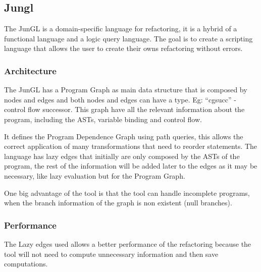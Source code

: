 
\subsection{Jungl}
The JunGL \cite{verbaere2006jungl} is a domain-specific language for refactoring, it is a hybrid of a functional language and a logic query language. The goal is to create a scripting language that allows the user to create their owns refactoring without errors.

\subsubsection{Architecture}
The JunGL has a Program Graph as main data structure that is composed by nodes and edges and both nodes and edges can have a type. Eg: “cgsucc” - control flow successor. This graph have all the relevant information about the program, including the ASTs, variable binding and control flow.

It defines the Program Dependence Graph using path queries, this allows the correct application of many transformations that need to reorder statements.
The language has lazy edges that initially are only composed by the ASTs of the program, the rest of the information will be added later to the edges as it may be necessary, like lazy evaluation but for the Program Graph.

One big advantage of the tool is that the tool can handle incomplete programs, when the branch information of the graph is non existent (null branches).

\subsubsection{Performance}


The Lazy edges used allows a better performance of the refactoring because the tool will not need to compute unnecessary information and then save computations.



